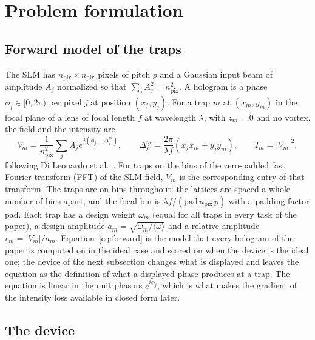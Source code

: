 \section{Problem formulation}\label{sec:problem}

\subsection{Forward model of the traps}

The SLM has $n_{\mathrm{pix}}\times n_{\mathrm{pix}}$ pixels of pitch $p$ and a Gaussian input beam of amplitude $A_j$ normalized so that $\sum_jA_j^2=n_{\mathrm{pix}}^2$. A hologram is a phase $\phi_j\in[0,2\pi)$ per pixel $j$ at
position $(x_j,y_j)$. For a trap $m$ at $(x_m,y_m)$ in the focal plane of a lens of focal length $f$ at wavelength $\lambda$, with $z_m=0$ and no vortex, the field and the intensity are
\begin{equation}
V_m=\frac1{n_{\mathrm{pix}}^2}\sum_jA_je^{\,i(\phi_j-\Delta_j^m)},\qquad \Delta_j^m=\frac{2\pi}{\lambda f}(x_jx_m+y_jy_m),\qquad I_m=|V_m|^2,\label{eq:forward}
\end{equation}
following Di Leonardo et al.~\cite{dileonardo}. For traps on the bins of the zero-padded fast Fourier transform (FFT) of the SLM field, $V_m$ is the corresponding entry of that transform. The traps are on bins throughout: the lattices
are spaced a whole number of bins apart, and the focal bin is $\lambda f/(\mathrm{pad}\,n_{\mathrm{pix}}\,p)$ with a padding factor $\mathrm{pad}$. Each trap has a design weight $\omega_m$ (equal for all traps in every task of the paper), a design amplitude $a_m=\sqrt{\omega_m/\langle\omega\rangle}$ and a relative amplitude $r_m=|V_m|/a_m$. Equation~\ref{eq:forward} is the model that every hologram of the paper is computed on in the ideal case and scored on when the device is the ideal one; the device of the next subsection changes what is displayed and leaves the equation as the definition of what a displayed phase produces at a trap. The equation is linear in the unit phasors $e^{i\phi_j}$, which is what makes the gradient of the intensity loss available in closed form later.

\subsection{The device}

